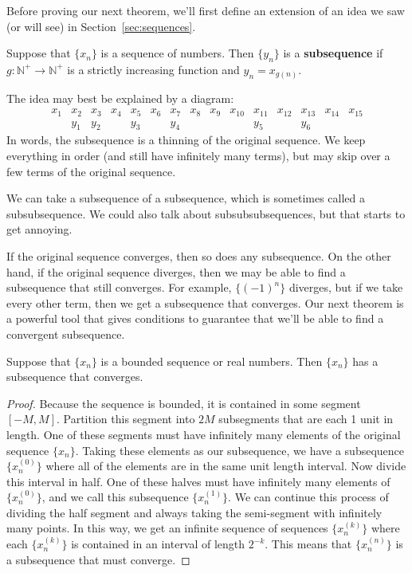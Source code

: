 Before proving our next theorem, we'll first define an extension of an idea we saw (or will see) in Section~\ref{sec:sequences}.

%
{Suppose that $\{x_n\}$ is a sequence of numbers.  Then $\{y_n\}$ is a \textbf{subsequence} if $g:\mathbb{N}^+\to\mathbb{N}^+$ is a strictly increasing function and $y_n=x_{g(n)}$.}

The idea may best be explained by a diagram:
\[
\begin{array}{ccccccccccccccc}
 x_1 & x_2 & x_3 & x_4 & x_5 & x_6 & x_7 & x_8 & x_9 & x_{10} & x_{11} & x_{12} & x_{13} & x_{14} & x_{15} \\
 & y_1 & y_2 & & y_3 & & y_4 & & & & y_5 & & y_6 & &
\end{array}
\]
In words, the subsequence is a thinning of the original sequence.  We keep everything in order (and still have infinitely many terms), but may skip over a few terms of the original sequence.

We can take a subsequence of a subsequence, which is sometimes called a subsubsequence.  We could also talk about subsubsubsequences, but that starts to get annoying.

If the original sequence converges, then so does any subsequence.  On the other hand, if the original sequence diverges, then we may be able to find a subsequence that still converges.  For example, $\{(-1)^n\}$ diverges, but if we take every other term, then we get a subsequence that converges.  Our next theorem is a powerful tool that gives conditions to guarantee that we'll be able to find a convergent subsequence.

{Suppose that $\{x_n\}$ is a bounded sequence or real numbers.  Then $\{x_n\}$ has a subsequence that converges.}

\begin{proof}
Because the sequence is bounded, it is contained in some segment $[-M,M]$.
Partition this segment into $2M$ subsegments that are each 1 unit in length.  One of these segments must have infinitely many elements of the original sequence $\{x_n\}$.  Taking these elements as our subsequence, we have a subsequence $\{x_n^{(0)}\}$ where all of the elements are in the same unit length interval.  Now divide this interval in half.  One of these halves must have infinitely many elements of $\{x_n^{(0)}\}$, and we call this subsequence $\{x_n^{(1)}\}$.  We can continue this process of dividing the half segment and always taking the semi-segment with infinitely many points.  In this way, we get an infinite sequence of sequences $\{x_n^{(k)}\}$ where each $\{x_n^{(k)}\}$ is contained in an interval of length $2^{-k}$.  This means that $\{x_n^{(n)}\}$ is a subsequence that must converge.
\end{proof}

